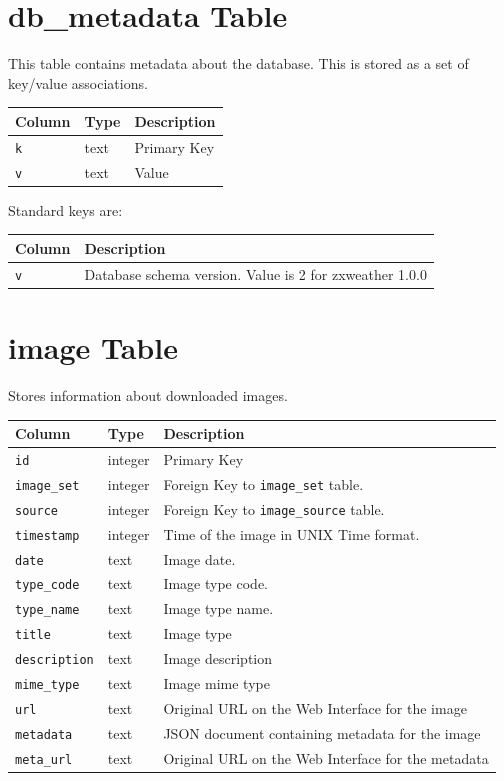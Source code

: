 \documentclass[a4paper,10pt]{book}
\begin{document}
\section{db\_metadata Table}
This table contains metadata about the database. This is stored as a set of key/value associations.

\begin{tabular}{p{2.5cm} p{2.5cm} l}
\hline
\textbf{Column} & \textbf{Type} & \textbf{Description} \\
\hline
\verb|k| & text & Primary Key\\
\verb|v| & text & Value\\
\hline
\end{tabular}

Standard keys are:

\begin{tabular}{p{2.5cm} l}
\hline
\textbf{Column} & \textbf{Description} \\
\hline
\verb|v| & Database schema version. Value is 2 for zxweather 1.0.0\\
\hline
\end{tabular}

\section{image Table}
Stores information about downloaded images.

\begin{tabular}{p{2.5cm} p{2.5cm} l}
\hline
\textbf{Column} & \textbf{Type} & \textbf{Description} \\
\hline
\verb|id| & integer & Primary Key\\
\verb|image_set| & integer & Foreign Key to \verb|image_set| table.\\
\verb|source| & integer & Foreign Key to \verb|image_source| table.\\
\verb|timestamp| & integer & Time of the image in UNIX Time format.\\
\verb|date| & text & Image date.\\
\verb|type_code| & text & Image type code.\\
\verb|type_name| & text & Image type name.\\
\verb|title| & text & Image type \\
\verb|description| & text & Image description\\
\verb|mime_type| & text & Image mime type\\
\verb|url| & text & Original URL on the Web Interface for the image\\
\verb|metadata| & text & JSON document containing metadata for the image\\
\verb|meta_url| & text & Original URL on the Web Interface for the metadata\\
\hline
\end{tabular}
\end{document}

